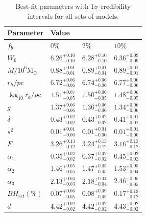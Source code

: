 

\begin{table}
	\centering
	\caption{Best-fit parameters with $1\sigma$ credibility intervals for all sets of models.}
	\begin{tabular}{l l l l}

		\hline
		Parameter                 & Value                                                                    \\
		\hline
		$f_b$                     & $0\%$                  & $2\%$                  & $10\%$                 \\
		$W_0$                  & $6.26^{+0.10}_{-0.10}$ & $6.28^{+0.10}_{-0.10}$ & $6.36^{+0.09}_{-0.09}$ \\
		$M/10^6 \mathrm{M}_\odot$ & $0.88^{+0.01}_{-0.01}$ & $0.89^{+0.01}_{-0.01}$ & $0.89^{+0.01}_{-0.01}$ \\
		$r_h / pc$                & $6.72^{+0.06}_{-0.06}$ & $6.74^{+0.06}_{-0.06}$ & $6.77^{+0.06}_{-0.06}$ \\
		$\log_{10}{r_a / pc}$     & $1.51^{+0.07}_{-0.05}$ & $1.50^{+0.06}_{-0.05}$ & $1.48^{+0.06}_{-0.05}$ \\
		$g$                       & $1.37^{+0.06}_{-0.06}$ & $1.36^{+0.06}_{-0.06}$ & $1.34^{+0.06}_{-0.06}$ \\
		$\delta$                  & $0.43^{+0.02}_{-0.02}$ & $0.43^{+0.02}_{-0.02}$ & $0.41^{+0.01}_{-0.01}$ \\
		$s^2$                     & $0.01^{+0.01}_{-0.00}$ & $0.01^{+0.01}_{-0.00}$ & $0.01^{+0.01}_{-0.00}$ \\
		$F$                       & $3.26^{+0.13}_{-0.12}$ & $3.24^{+0.13}_{-0.12}$ & $3.16^{+0.13}_{-0.12}$ \\
		$\alpha_1$                & $0.35^{+0.02}_{-0.02}$ & $0.37^{+0.02}_{-0.02}$ & $0.45^{+0.02}_{-0.02}$ \\
		$\alpha_2$                & $1.46^{+0.05}_{-0.05}$ & $1.47^{+0.05}_{-0.05}$ & $1.53^{+0.05}_{-0.04}$ \\
		$\alpha_3$                & $2.13^{+0.04}_{-0.03}$ & $2.18^{+0.04}_{-0.04}$ & $2.46^{+0.05}_{-0.05}$ \\
		$BH_{ret} (\%)$           & $0.07^{+0.06}_{-0.05}$ & $0.08^{+0.09}_{-0.05}$ & $0.17^{+0.18}_{-0.12}$ \\
		$d$                       & $4.42^{+0.02}_{-0.02}$ & $4.42^{+0.02}_{-0.02}$ & $4.43^{+0.02}_{-0.02}$ \\
		\hline
	\end{tabular}
	\label{tab:parameters_all}
\end{table}







